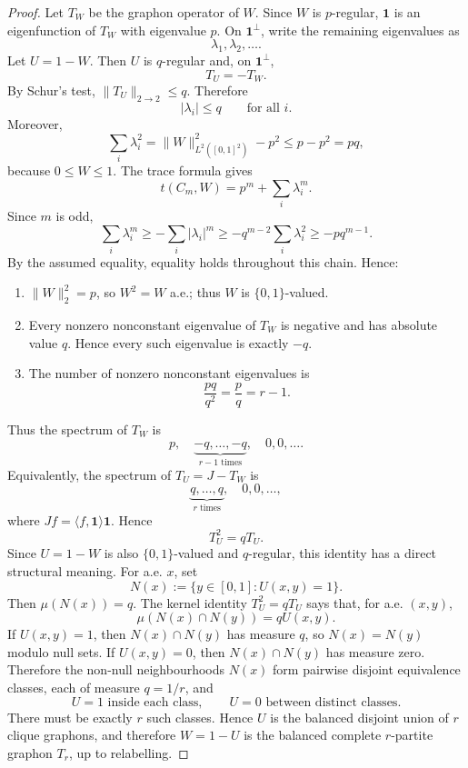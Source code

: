 \documentclass[11pt]{article}
\newcommand{\one}{\mathbf 1}
\begin{document}
\begin{proof}
Let \(T_W\) be the graphon operator of \(W\).  Since \(W\) is \(p\)-regular,
\(\one\) is an eigenfunction of \(T_W\) with eigenvalue \(p\).  On
\(\one^\perp\), write the remaining eigenvalues as
\[
        \lambda_1,\lambda_2,\ldots .
\]
Let \(U=1-W\).  Then \(U\) is \(q\)-regular and, on \(\one^\perp\),
\[
        T_U=-T_W.
\]
By Schur's test, \(\|T_U\|_{2\to2}\le q\).  Therefore
\[
        |\lambda_i|\le q
        \qquad\text{for all }i.
\]
Moreover,
\[
        \sum_i\lambda_i^2
        =\|W\|_{L^2([0,1]^2)}^2-p^2
        \le p-p^2=pq,
\]
because \(0\le W\le1\).  The trace formula gives
\[
        t(C_m,W)=p^m+\sum_i\lambda_i^m.
\]
Since \(m\) is odd,
\[
        \sum_i\lambda_i^m
        \ge -\sum_i |\lambda_i|^m
        \ge -q^{m-2}\sum_i\lambda_i^2
        \ge -pq^{m-1}.
\]
By the assumed equality, equality holds throughout this chain.  Hence:
\begin{enumerate}[label=(\roman*)]
\item \(\|W\|_2^2=p\), so \(W^2=W\) a.e.; thus \(W\) is \(\{0,1\}\)-valued.
\item Every nonzero nonconstant eigenvalue of \(T_W\) is negative and has
absolute value \(q\).  Hence every such eigenvalue is exactly \(-q\).
\item The number of nonzero nonconstant eigenvalues is
\[
        \frac{pq}{q^2}=\frac pq=r-1.
\]
\end{enumerate}
Thus the spectrum of \(T_W\) is
\[
        p,\quad \underbrace{-q,\ldots,-q}_{r-1\text{ times}},\quad 0,0,\ldots .
\]
Equivalently, the spectrum of \(T_U=J-T_W\) is
\[
        \underbrace{q,\ldots,q}_{r\text{ times}},\quad 0,0,\ldots,
\]
where \(Jf=\langle f,\one\rangle\one\).  Hence
\[
        T_U^2=qT_U.
\]
Since \(U=1-W\) is also \(\{0,1\}\)-valued and \(q\)-regular, this identity has
a direct structural meaning.  For a.e. \(x\), set
\[
        N(x):=\{y\in[0,1]: U(x,y)=1\}.
\]
Then \(\mu(N(x))=q\).  The kernel identity \(T_U^2=qT_U\) says that, for a.e.
\((x,y)\),
\[
        \mu(N(x)\cap N(y))=qU(x,y).
\]
If \(U(x,y)=1\), then \(N(x)\cap N(y)\) has measure \(q\), so
\(N(x)=N(y)\) modulo null sets.  If \(U(x,y)=0\), then
\(N(x)\cap N(y)\) has measure zero.  Therefore the non-null neighbourhoods
\(N(x)\) form pairwise disjoint equivalence classes, each of measure
\(q=1/r\), and
\[
        U=1 \text{ inside each class},
        \qquad U=0 \text{ between distinct classes}.
\]
There must be exactly \(r\) such classes.  Hence \(U\) is the balanced disjoint
union of \(r\) clique graphons, and therefore \(W=1-U\) is the balanced complete
\(r\)-partite graphon \(T_r\), up to relabelling.
\end{proof}
\end{document}
